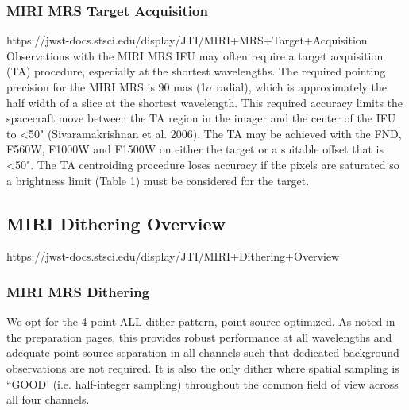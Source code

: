         \subsubsection{MIRI MRS Target Acquisition}
        https://jwst-docs.stsci.edu/display/JTI/MIRI+MRS+Target+Acquisition
        Observations with the MIRI MRS IFU may often require a target acquisition
        (TA) procedure, especially at the shortest wavelengths. The required
        pointing precision for the MIRI MRS is 90 mas (1$\sigma$ radial),
        which is approximately the half width of a slice at the shortest
        wavelength. This required accuracy limits the spacecraft move between
        the TA region in the imager and the center of the IFU to <50"
        (Sivaramakrishnan et al. 2006).  The TA may be achieved with the FND,
        F560W, F1000W and F1500W on either the target or a suitable offset
        that is <50". The TA centroiding procedure loses accuracy if the
        pixels are saturated so a brightness limit (Table 1) must be
        considered for the target.

    \subsection{MIRI Dithering Overview}
    https://jwst-docs.stsci.edu/display/JTI/MIRI+Dithering+Overview
        \subsubsection{MIRI MRS Dithering}
        We opt for the 4-point ALL dither pattern, point source
        optimized.  As noted in the preparation pages, this provides robust
        performance at all wavelengths and adequate point source separation in
        all channels such that dedicated background observations are not
        required. It is also the only dither where spatial sampling is ``GOOD’
        (i.e. half-integer sampling) throughout the common field of view
        across all four channels.

